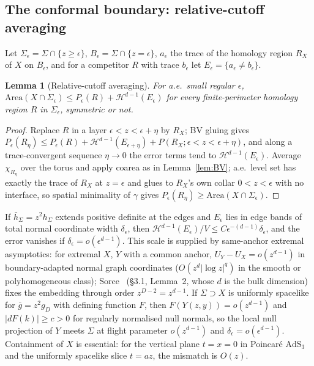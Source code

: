 \documentclass[aps,prd,onecolumn,superscriptaddress,nofootinbib,amsmath,amssymb,11pt]{revtex4-2}
\newtheorem{lemma}[theorem]{Lemma}
\theoremstyle{definition}
\newcommand{\AdS}{\mathrm{AdS}_3}
\newcommand{\eps}{\epsilon}
\begin{document}
\subsection{The conformal boundary: relative-cutoff averaging}\label{sec:stripUV}

Let $\Sigma_\eps=\Sigma\cap\{z\ge\eps\}$, $B_\eps=\Sigma\cap\{z=\eps\}$, $a_\eps$ the trace of the homology region $R_X$ of $X$ on $B_\eps$, and for a
competitor $R$ with trace $b_\eps$ let $E_\eps=\{a_\eps\ne b_\eps\}$.

\begin{lemma}[Relative-cutoff averaging]\label{lem:relcut}
For a.e.\ small regular $\eps$, $\mathrm{Area}(X\cap\Sigma_\eps)\le P_\eps(R)+\mathcal H^{d-1}(E_\eps)$ for every finite-perimeter homology region $R$
in $\Sigma_\eps$, symmetric or not.
\end{lemma}

\begin{proof}
Replace $R$ in a layer $\eps<z<\eps+\eta$ by $R_X$; BV gluing gives
$P_\eps(R_\eta)\le P_\eps(R)+\mathcal H^{d-1}(E_{\eps+\eta})+P(R_X;\eps<z<\eps+\eta)$, and along a trace-convergent sequence $\eta\to0$ the error terms
tend to $\mathcal H^{d-1}(E_\eps)$. Average $\chi_{R_\eta}$ over the torus and apply coarea as in Lemma~\ref{lem:BV}; a.e.\ level set has exactly
the trace of $R_X$ at $z=\eps$ and glues to $R_X$'s own collar $0<z<\eps$ with no interface, so spatial minimality of $\gamma$ gives
$P_\eps(R_\eta)\ge\mathrm{Area}(X\cap\Sigma_\eps)$.
\end{proof}

If $\bar h_\Sigma=z^2h_\Sigma$ extends positive definite at the edges and $E_\eps$ lies in edge bands of total normal coordinate width
$\delta_\eps$, then $\mathcal H^{d-1}(E_\eps)/V\le C\eps^{-(d-1)}\delta_\eps$, and the error vanishes if $\delta_\eps=o(\eps^{d-1})$. This scale is supplied by
same-anchor extremal asymptotics: for extremal $X$, $Y$ with a common anchor, $U_Y-U_X=o(z^{d-1})$ in boundary-adapted normal graph
coordinates ($O(z^d|\log z|^q)$ in the smooth or polyhomogeneous class); Sorce~\cite{Sorce2019} (\S3.1, Lemma~2, whose $d$ is the bulk
dimension) fixes the embedding through order $z^{D-2}=z^{d-1}$. If $\Sigma\supset X$ is uniformly spacelike for $\bar g=z^2g_D$ with
defining function $F$, then $F(Y(z,y))=o(z^{d-1})$ and $|dF(k)|\ge c>0$ for regularly normalised null normals, so the local null
projection of $Y$ meets $\Sigma$ at flight parameter $o(z^{d-1})$ and $\delta_\eps=o(\eps^{d-1})$. Containment of $X$ is essential: for the vertical
plane $t=x=0$ in Poincar\'e $\AdS$ and the uniformly spacelike slice $t=az$, the mismatch is $O(z)$.
\end{document}

